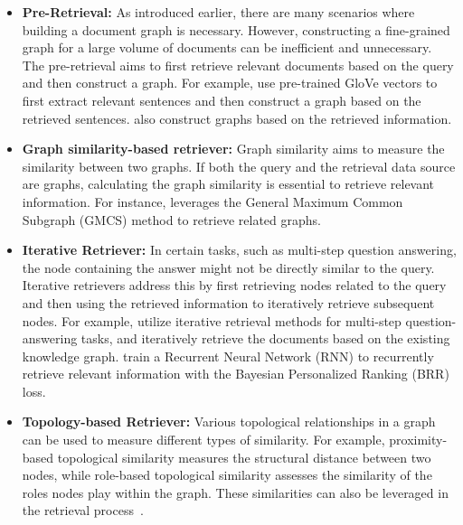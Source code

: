 \begin{itemize}[leftmargin=*]
    \item \textbf{Pre-Retrieval:} As introduced earlier, there are many scenarios where building a document graph is necessary. However, constructing a fine-grained graph for a large volume of documents can be inefficient and unnecessary. The pre-retrieval aims to first retrieve relevant documents based on the query and then construct a graph. For example, \citet{thayaparan2019identifying} use pre-trained GloVe vectors to first extract relevant sentences and then construct a graph based on the retrieved sentences. \citet{zheng2020srlgrn, yu2021kg} also construct graphs based on the retrieved information.
    
    \item \textbf{Graph similarity-based retriever:}  Graph similarity aims to measure the similarity between two graphs. If both the query and the retrieval data source are graphs, calculating the graph similarity is essential to retrieve relevant information. For instance, \cite{zhang2018graph} leverages the General Maximum Common Subgraph (GMCS) method to retrieve related graphs.
    
    \item \textbf{Iterative Retriever:} In certain tasks, such as multi-step question answering, the node containing the answer might not be directly similar to the query. Iterative retrievers address this by first retrieving nodes related to the query and then using the retrieved information to iteratively retrieve subsequent nodes. For example, \citet{wang2024knowledge, zhang2021answering} utilize iterative retrieval methods for multi-step question-answering tasks, and \citet{ma2024think} iteratively retrieve the documents based on the existing knowledge graph. \citet{asai2019learning} train a Recurrent Neural Network (RNN) to recurrently retrieve relevant information with the Bayesian Personalized Ranking (BRR) loss.
    
    \item \textbf{Topology-based Retriever:} Various topological relationships in a graph can be used to measure different types of similarity. For example, proximity-based topological similarity measures the structural distance between two nodes, while role-based topological similarity assesses the similarity of the roles nodes play within the graph. These similarities can also be leveraged in the retrieval process~\citep{wang2024augmenting}.
\end{itemize}



